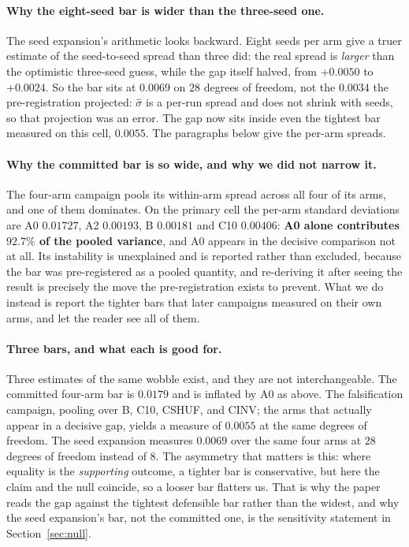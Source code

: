 \documentclass{article}
\begin{document}
\paragraph{Why the eight-seed bar is wider than the three-seed one.} The seed expansion's arithmetic looks backward. Eight seeds per arm give a truer estimate of the seed-to-seed spread
than three did: the real spread is \emph{larger} than the optimistic three-seed guess, while the gap
itself halved, from $+0.0050$ to $+0.0024$. So the bar sits at $0.0069$ on $28$ degrees of freedom,
not the $0.0034$ the pre-registration projected: $\hat{\sigma}$ is a per-run spread and does not
shrink with seeds, so that projection was an error. The gap now sits inside even the tightest bar
measured on this cell, $0.0055$. The paragraphs below give the per-arm spreads.





\paragraph{Why the committed bar is so wide, and why we did not narrow it.} The four-arm campaign
pools its within-arm spread across all four of its arms, and one of them dominates. On the primary
cell the per-arm standard deviations are A0 $0.01727$, A2 $0.00193$, B $0.00181$ and C10 $0.00406$:
\textbf{A0 alone contributes $92.7\%$ of the pooled variance}, and A0 appears in the decisive
comparison not at all. Its instability is unexplained and is reported rather than excluded, because
the bar was pre-registered as a pooled quantity, and re-deriving it after seeing the result is
precisely the move the pre-registration exists to prevent. What we do instead is report the tighter
bars that later campaigns measured on their own arms, and let the reader see all of them.

\paragraph{Three bars, and what each is good for.} Three estimates of the same wobble exist,
and they are not interchangeable. The committed four-arm bar is $0.0179$ and is inflated by A0 as
above. The falsification campaign, pooling over B, C10, CSHUF, and CINV; the arms that actually appear in a decisive gap, yields a measure of $0.0055$ at the same degrees of freedom. The seed expansion
measures $0.0069$ over the same four arms at $28$ degrees of freedom instead of $8$. The asymmetry
that matters is this: where equality is the \emph{supporting} outcome, a tighter bar is
conservative, but here the claim and the null coincide, so a looser bar flatters us. That is why the
paper reads the gap against the tightest defensible bar rather than the widest, and why the seed
expansion's bar, not the committed one, is the sensitivity statement in Section~\ref{sec:null}.
\end{document}
